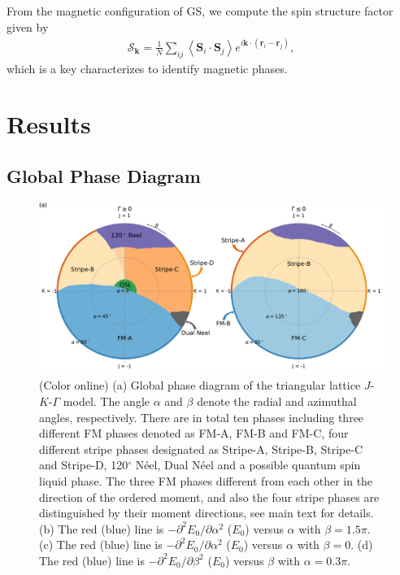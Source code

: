 \documentclass[aps,prb,reprint,amsfonts,amsmath,amssymb,showpacs,groupedaddress,superscriptaddress]{revtex4-1}
\begin{document}
From the magnetic configuration of GS, we compute the spin structure factor given by
\begin{align}
    \mathcal{S}_{\bm{k}} = \frac{1}{N} \sum_{ij} \left \langle \bm{S}_i \cdot \bm{S}_j \right \rangle e^{i \bm{k} \cdot (\bm{r}_i-\bm{r}_j)},
\end{align}
which is a key characterizes to identify magnetic phases.

\section{\label{sec:Results}Results}

\subsection{\label{subsec:GlobalPhaseDiagram}Global Phase Diagram}

\begin{figure}
    \centering
    \includegraphics[width=\textwidth]{fig/QuantumGlobalPhaseDiagram.pdf}
    \caption{\label{fig:QuantumPhaseDiagram}(Color online) (a) Global phase diagram of the triangular lattice $J$-$K$-$\Gamma$ model. The angle $\alpha$ and $\beta$ denote the radial and azimuthal angles, respectively. There are in total ten phases including three different FM phases denoted as FM-A, FM-B and FM-C, four different stripe phases designated as Stripe-A, Stripe-B, Stripe-C and Stripe-D, 120$^\circ$ N\'{e}el, Dual N\'{e}el and a possible quantum spin liquid phase. The three FM phases different from each other in the direction of the ordered moment, and also the four stripe phases are distinguished by their moment directions, see main text for details. (b) The red (blue) line is $-\partial^2E_0/\partial\alpha^2$ ($E_0$) versus $\alpha$ with $\beta=1.5\pi$. (c) The red (blue) line is $-\partial^2E_0/\partial\alpha^2$ ($E_0$) versus $\alpha$ with $\beta=0$. (d) The red (blue) line is $-\partial^2E_0/\partial\beta^2$ ($E_0$) versus $\beta$ with $\alpha=0.3\pi$.}
\end{figure}
\end{document}
